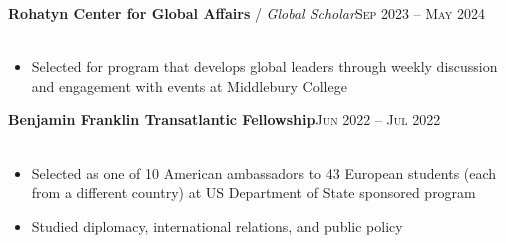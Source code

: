 \documentclass[12pt, a4paper]{article}
\begin{document}
\textbf{Rohatyn Center for Global Affairs} / \textit{Global Scholar}\hfill\textsc{Sep 2023 -- May 2024}\\\
\begin{itemize}
    \vspace{-8mm}
    \item Selected for program that develops global leaders through weekly discussion and engagement with events at Middlebury College
\end{itemize}



\textbf{Benjamin Franklin Transatlantic Fellowship}\hfill\textsc{Jun 2022 -- Jul 2022}\\\
\begin{itemize}
    \vspace{-8mm}
    \item Selected as one of 10 American ambassadors to 43 European students (each from a different country) at US Department of State sponsored program
    \item Studied diplomacy, international relations, and public policy
\end{itemize}

\end{document}
